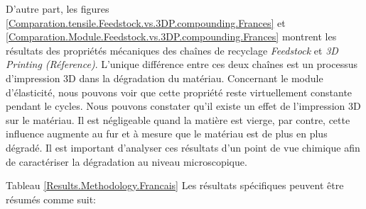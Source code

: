 D'autre part,  les figures \ref{Comparation.tensile.Feedstock.vs.3DP.compounding.Frances} et \ref{Comparation.Module.Feedstock.vs.3DP.compounding.Frances} montrent les résultats des propriétés mécaniques des chaînes de recyclage \textit{Feedstock} et \textit{3D Printing (Réference)}. 
L'unique différence entre ces deux chaînes est un processus d'impression 3D dans la dégradation du matériau.
Concernant le module d'élasticité, nous pouvons voir que cette propriété reste virtuellement constante pendant le cycles.
Nous pouvons constater qu'il existe un effet de l'impression 3D sur le matériau. 
Il est négligeable quand la matière est vierge, par contre,
cette influence augmente au fur et à mesure que le matériau est de plus en plus dégradé.
Il est important d'analyser ces résultats d'un point de vue chimique afin de caractériser la dégradation au niveau microscopique.
 

Tableau \ref{Results.Methodology.Francais} Les résultats spécifiques peuvent être résumés comme suit:


